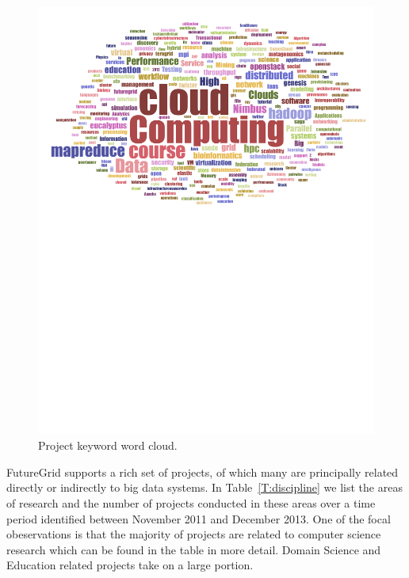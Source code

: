 \documentclass[graybox]{svmult}
\begin{document}
\begin{figure}[htb]
\begin{minipage}[t]{1.0\textwidth}
 \centering
   \includegraphics[width=1.0\textwidth]{images/fg-keyword-wordcloud.pdf}
 \caption{Project keyword word cloud.}\label{F:keycloud}
\end{minipage}
\end{figure}

FutureGrid supports a rich set of projects, of which many are principally related directly or indirectly to big data systems. In Table~\ref{T:discipline} we list the areas of research and the number of projects conducted in these areas over a time period identified between November 2011 and December 2013. One of the focal obeservations is that the majority of projects are related to computer science research which can be found in the table in more detail. Domain Science and Education related projects take on a large portion.
\end{document}

